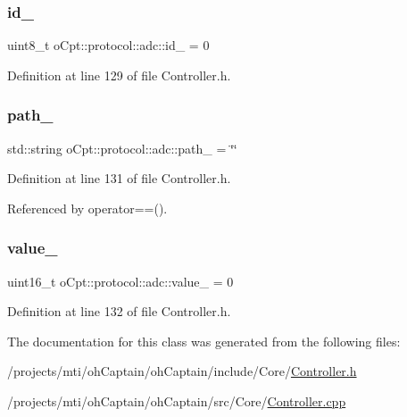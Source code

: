 \subsubsection{\texorpdfstring{id\+\_\+}{id\_}}
{\footnotesize\ttfamily uint8\+\_\+t o\+Cpt\+::protocol\+::adc\+::id\+\_\+ = 0\hspace{0.3cm}{\ttfamily [private]}}



Definition at line 129 of file Controller.\+h.

\hypertarget{classo_cpt_1_1protocol_1_1adc_a23481c789dd95444a3e9a19beb5b044e}{}\label{classo_cpt_1_1protocol_1_1adc_a23481c789dd95444a3e9a19beb5b044e} 
\subsubsection{\texorpdfstring{path\+\_\+}{path\_}}
{\footnotesize\ttfamily std\+::string o\+Cpt\+::protocol\+::adc\+::path\+\_\+ = \char`\"{}\char`\"{}\hspace{0.3cm}{\ttfamily [private]}}



Definition at line 131 of file Controller.\+h.



Referenced by operator==().

\hypertarget{classo_cpt_1_1protocol_1_1adc_a79ed77ed852cbe9c1b23e9c3601ffdb7}{}\label{classo_cpt_1_1protocol_1_1adc_a79ed77ed852cbe9c1b23e9c3601ffdb7} 
\subsubsection{\texorpdfstring{value\+\_\+}{value\_}}
{\footnotesize\ttfamily uint16\+\_\+t o\+Cpt\+::protocol\+::adc\+::value\+\_\+ = 0\hspace{0.3cm}{\ttfamily [private]}}



Definition at line 132 of file Controller.\+h.



The documentation for this class was generated from the following files\+:\begin{DoxyCompactItemize}
\item 
/projects/mti/oh\+Captain/oh\+Captain/include/\+Core/\hyperlink{_controller_8h}{Controller.\+h}\item 
/projects/mti/oh\+Captain/oh\+Captain/src/\+Core/\hyperlink{_controller_8cpp}{Controller.\+cpp}\end{DoxyCompactItemize}
